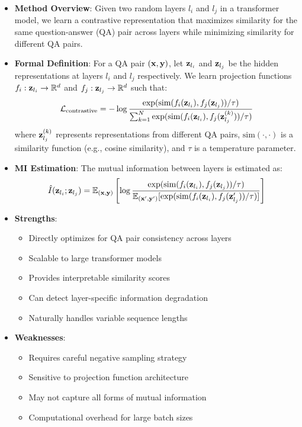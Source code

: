 \begin{itemize}
    \item \textbf{Method Overview}: Given two random layers $l_i$ and $l_j$ in a transformer model, we learn a contrastive representation that maximizes similarity for the same question-answer (QA) pair across layers while minimizing similarity for different QA pairs.

    \item \textbf{Formal Definition}: For a QA pair $({\mathbf{x}}, {\mathbf{y}})$, let ${\mathbf{z}}_{l_i}$ and ${\mathbf{z}}_{l_j}$ be the hidden representations at layers $l_i$ and $l_j$ respectively. We learn projection functions $f_i: {\mathbf{z}}_{l_i} \rightarrow \mathbb{R}^d$ and $f_j: {\mathbf{z}}_{l_j} \rightarrow \mathbb{R}^d$ such that:
    \[
    \mathcal{L}_{\text{contrastive}} = -\log \frac{\exp(\text{sim}(f_i({\mathbf{z}}_{l_i}), f_j({\mathbf{z}}_{l_j})) / \tau)}{\sum_{k=1}^{N} \exp(\text{sim}(f_i({\mathbf{z}}_{l_i}), f_j({\mathbf{z}}_{l_j}^{(k)})) / \tau)}
    \]
    where ${\mathbf{z}}_{l_j}^{(k)}$ represents representations from different QA pairs, $\text{sim}(\cdot, \cdot)$ is a similarity function (e.g., cosine similarity), and $\tau$ is a temperature parameter.

    \item \textbf{MI Estimation}: The mutual information between layers is estimated as:
    \[
    \hat{I}({\mathbf{z}}_{l_i}; {\mathbf{z}}_{l_j}) = \mathbb{E}_{({\mathbf{x}},{\mathbf{y}})} \left[ \log \frac{\exp(\text{sim}(f_i({\mathbf{z}}_{l_i}), f_j({\mathbf{z}}_{l_j})) / \tau)}{\mathbb{E}_{({\mathbf{x}}',{\mathbf{y}}')} [\exp(\text{sim}(f_i({\mathbf{z}}_{l_i}), f_j({\mathbf{z}}_{l_j}')) / \tau)]} \right]
    \]

    \item \textbf{Strengths}:
    \begin{itemize}
        \item Directly optimizes for QA pair consistency across layers
        \item Scalable to large transformer models
        \item Provides interpretable similarity scores
        \item Can detect layer-specific information degradation
        \item Naturally handles variable sequence lengths
    \end{itemize}

    \item \textbf{Weaknesses}:
    \begin{itemize}
        \item Requires careful negative sampling strategy
        \item Sensitive to projection function architecture
        \item May not capture all forms of mutual information
        \item Computational overhead for large batch sizes
    \end{itemize}


\end{itemize}
